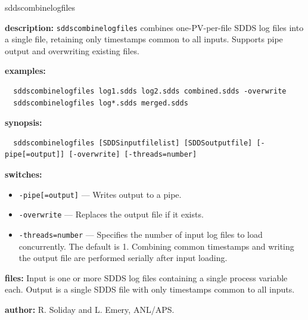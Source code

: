 \begin{sddsprog}{sddscombinelogfiles}
  \item \textbf{description:} \verb|sddscombinelogfiles| combines one-PV-per-file SDDS log files into a single file, retaining only timestamps common to all inputs. Supports pipe output and overwriting existing files.
  \item \textbf{examples:}
  \begin{verbatim}
  sddscombinelogfiles log1.sdds log2.sdds combined.sdds -overwrite
  sddscombinelogfiles log*.sdds merged.sdds
  \end{verbatim}
  \item \textbf{synopsis:}
  \begin{verbatim}
  sddscombinelogfiles [SDDSinputfilelist] [SDDSoutputfile] [-pipe[=output]] [-overwrite] [-threads=number]
  \end{verbatim}
  \item \textbf{switches:}
    \begin{itemize}
      \item \verb|-pipe[=output]| --- Writes output to a pipe.
      \item \verb|-overwrite| --- Replaces the output file if it exists.
      \item \verb|-threads=number| --- Specifies the number of input log files to load concurrently.
        The default is 1. Combining common timestamps and writing the output file are performed
        serially after input loading.
    \end{itemize}
  \item \textbf{files:} Input is one or more SDDS log files containing a single process variable each. Output is a single SDDS file with only timestamps common to all inputs.
  \item \textbf{author:} R. Soliday and L. Emery, ANL/APS.
\end{sddsprog}

